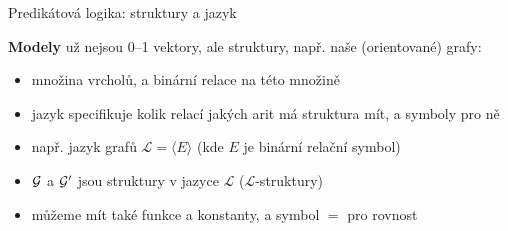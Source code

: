 \documentclass{beamer}
\begin{document}
\begin{frame}{Predikátová logika: struktury a jazyk}

    \textbf{Modely} už nejsou 0--1 vektory, ale \alert{struktury}, např. naše (orientované) grafy:


    \pause
    \begin{itemize}
        \item množina vrcholů, a binární relace na této množině
        \pause
        \item \alert{jazyk} specifikuje kolik \alert{relací} jakých arit má struktura mít, a symboly pro ně
        \pause
        \item např. \alert{jazyk grafů} \( \mathcal L=\langle E \rangle \) (kde \(E\) je binární relační symbol)
        \pause
        \item $\mathcal{G}$ a $\mathcal{G}'$ jsou \alert{struktury v jazyce} $\mathcal L$ (\alert{$\mathcal L$-struktury})   
        \pause
        \item můžeme mít také \alert{funkce} a \alert{konstanty}, a symbol \alert{$=$} pro \alert{rovnost} 
    \end{itemize}

\end{frame}
\end{document}
